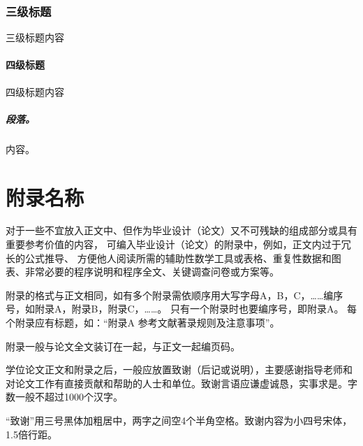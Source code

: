 \documentclass[fontset = mac ms]{seuthesis2024b}
\begin{document}
      \subsection{三级标题}
        三级标题内容
        \subsubsection{四级标题}
        四级标题内容
          \paragraph{段落。}内容。

  \chapterBib

  \appendix
  \chapter{附录名称}
    对于一些不宜放入正文中、但作为毕业设计（论文）又不可残缺的组成部分或具有重要参考价值的内容，
    可编入毕业设计（论文）的附录中，例如，正文内过于冗长的公式推导、
    方便他人阅读所需的辅助性数学工具或表格、重复性数据和图表、非常必要的程序说明和程序全文、关键调查问卷或方案等。

    附录的格式与正文相同，如有多个附录需依顺序用大写字母A，B，C，……编序号，如附录A，附录B，附录C，……。
    只有一个附录时也要编序号，即附录A。
    每个附录应有标题，如：“附录A 参考文献著录规则及注意事项”。

    附录一般与论文全文装订在一起，与正文一起编页码。
  
  \chapterAck
    学位论文正文和附录之后，一般应放置致谢（后记或说明），主要感谢指导老师和对论文工作有直接贡献和帮助的人士和单位。致谢言语应谦虚诚恳，实事求是。字数一般不超过1000个汉字。

    “致谢”用三号黑体加粗居中，两字之间空4个半角空格。致谢内容为小四号宋体，1.5倍行距。
  
\end{document}
